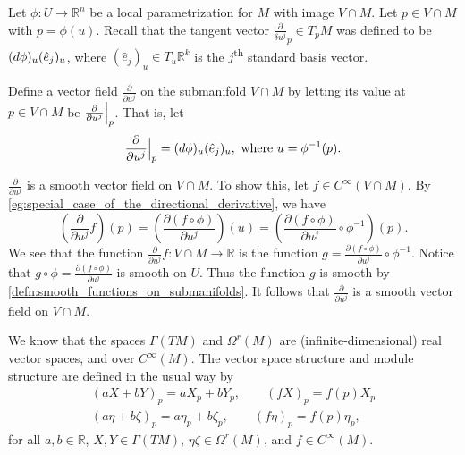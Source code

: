 \documentclass[notoc,notitlepage]{tufte-book}
\begin{document}
\begin{eg}[\imponote]\label{eg:important_eg_for_smoothness_on_submanifolds}
  Let $\phi : U \to \mathbb{R}^n$ be a local parametrization for $M$ with image
  $V \cap M$. Let $p \in V \cap M$ with $p = \phi(u)$. Recall that the tangent
  vector $\frac{\partial}{\delta u^j}_p \in T_p M$ was defined to be
  $(\mathop{}\!d{\phi})_u(\hat{e}_j)_u$, where $(\hat{e}_j)_u \in T_u \mathbb{R}^k$ is
  the $j$\textsuperscript{th} standard basis vector.

  Define a vector field $\frac{\partial}{\partial u^j}$ on the submanifold $V
  \cap M$ by letting its value at $p \in V \cap M$ be $\frac{\partial}{\partial
  u^j}\Big|_{p}^{}$. That is, let
  \begin{equation*}
    \frac{\partial}{\partial u^j}\Big|_{p}^{} = (\mathop{}\!d{\phi})_u (\hat{e}_j)_u,
    \text{ where } u = \phi^{-1}(p).
  \end{equation*}

   $\frac{\partial}{\partial u^j}$ is a smooth vector field on
  $V \cap M$. To show this, let $f \in C^\infty(V \cap M)$. By
  \cref{eg:special_case_of_the_directional_derivative}, we have
  \begin{equation*}
    \left( \frac{\partial}{\partial u^j} f \right)(p)
    = \left( \frac{\partial(f \circ \phi)}{\partial u^j} \right)(u)
    = \left( \frac{\partial(f \circ \phi)}{\partial u^j} \circ \phi^{-1}
    \right)(p).
  \end{equation*}
  We see that the function $\frac{\partial}{\partial u^j} f : V \cap M \to
  \mathbb{R}$ is the function $g = \frac{\partial(f\circ\phi)}{\partial u^j}
  \circ \phi^{-1}$. Notice that $g \circ \phi =
  \frac{\partial(f\circ\phi)}{\partial u^j}$ is smooth on $U$. Thus the function
  $g$ is smooth by \cref{defn:smooth_functions_on_submanifolds}. It follows that
  $\frac{\partial}{\partial u^j}$ is a smooth vector field on $V \cap M$.
\end{eg}

\begin{propo}\label{propo:structures_of_gamma_tm_and_omega_r_m_}
  We know that the spaces $\Gamma(TM)$ and $\Omega^r(M)$ are
  (infinite-dimensional) real vector spaces, and  over
  $C^\infty(M)$. The vector space structure and module structure are defined in
  the usual way by
  \begin{gather*}
    (aX + bY)_p = aX_p + bY_p, \qquad (fX)_p = f(p)X_p \\
    (a\eta + b\zeta)_p = a\eta_p + b\zeta_p, \qquad (f\eta)_p = f(p)\eta_p,
  \end{gather*} 
  for all $a, b \in \mathbb{R}$, $X, Y \in \Gamma(TM)$, $\eta \zeta \in
  \Omega^r(M)$, and $f \in C^\infty(M)$.
\end{propo}
\end{document}
